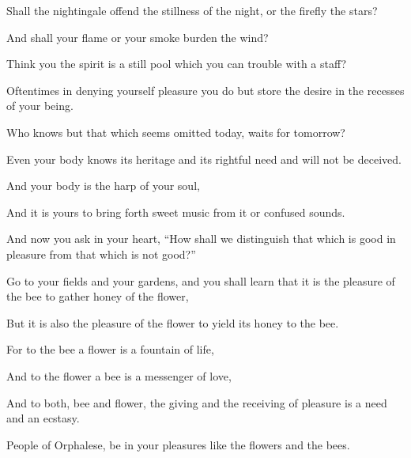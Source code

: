 Shall the nightingale offend the
stillness of the night, or the firefly
the stars?

And shall your flame or your smoke
burden the wind?

Think you the spirit is a still pool
which you can trouble with a staff?



Oftentimes in denying yourself pleasure
you do but store the desire in the
recesses of your being.

Who knows but that which seems omitted
today, waits for tomorrow?

Even your body knows its heritage
and its rightful need and will not be
deceived.

And your body is the harp of your soul,

And it is yours to bring forth sweet
music from it or confused sounds.



And now you ask in your heart, “How
shall we distinguish that which is
good in pleasure from that which is not
good?”

Go to your fields and your gardens, and
you shall learn that it is the pleasure
of the bee to gather honey of the
flower,

But it is also the pleasure of the
flower to yield its honey to the bee.

For to the bee a flower is a fountain of
life,

And to the flower a bee is a messenger
of love,

And to both, bee and flower, the giving
and the receiving of pleasure is a need
and an ecstasy.

People of Orphalese, be in your
pleasures like the flowers and the bees.